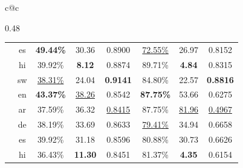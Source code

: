 \begin{table}[t!]
\begin{tabular}{c@{\hspace{1em}}c}
\begin{subtable}[c]{0.48\textwidth}
{\begin{tabular}{ccccc|ccc}
          & \cellcolor[HTML]{FFF1D5}\textsf{es} & \cellcolor[HTML]{FFF1D5}\textbf{49.44\%} & \cellcolor[HTML]{FFF1D5}30.36 & \cellcolor[HTML]{FFF1D5}0.8900 & \cellcolor[HTML]{FFF1D5}\underline{72.55\%} & \cellcolor[HTML]{FFF1D5}26.97 & \cellcolor[HTML]{FFF1D5}0.8152\\


          & \cellcolor[HTML]{F2CFC2}\textsf{hi} & \cellcolor[HTML]{F2CFC2}39.92\% & \cellcolor[HTML]{F2CFC2}\textbf{8.12} & \cellcolor[HTML]{F2CFC2}0.8874 & \cellcolor[HTML]{F2CFC2}89.71\% & \cellcolor[HTML]{F2CFC2}\textbf{4.84} & \cellcolor[HTML]{F2CFC2}0.8315\\


          & \cellcolor[HTML]{DDF6D2}\textsf{sw} & \cellcolor[HTML]{DDF6D2}\underline{38.31\%} & \cellcolor[HTML]{DDF6D2}24.04 & \cellcolor[HTML]{DDF6D2}\textbf{0.9141} & \cellcolor[HTML]{DDF6D2}84.80\% & \cellcolor[HTML]{DDF6D2}22.57 & \cellcolor[HTML]{DDF6D2}\textbf{0.8816}\\

            \midrule

          \multirow{6}{*}{\rotatebox[origin=c]{90}{\scriptsize{\lm{Gemma3-27B}}}}
          & \cellcolor[HTML]{d8d8d8}\textsf{en} & \cellcolor[HTML]{d8d8d8}\textbf{43.37\%} & \cellcolor[HTML]{d8d8d8}\underline{38.26} & \cellcolor[HTML]{d8d8d8}0.8542 & \cellcolor[HTML]{d8d8d8}\textbf{87.75\%} & \cellcolor[HTML]{d8d8d8}53.66 & \cellcolor[HTML]{d8d8d8}0.6275\\

          & \cellcolor[HTML]{E5CCFF}\textsf{ar} & \cellcolor[HTML]{E5CCFF}37.59\% & \cellcolor[HTML]{E5CCFF}36.32 & \cellcolor[HTML]{E5CCFF}\underline{0.8415}& \cellcolor[HTML]{E5CCFF}87.75\% & \cellcolor[HTML]{E5CCFF}\underline{81.96} & \cellcolor[HTML]{E5CCFF}\underline{0.4967} \\

          & \cellcolor[HTML]{E0E6FF}\textsf{de} & \cellcolor[HTML]{E0E6FF}38.19\% & \cellcolor[HTML]{E0E6FF}33.69 & \cellcolor[HTML]{E0E6FF}0.8633 & \cellcolor[HTML]{E0E6FF}\underline{79.41\%} & \cellcolor[HTML]{E0E6FF}34.94 & \cellcolor[HTML]{E0E6FF}0.6658\\


          & \cellcolor[HTML]{FFF1D5}\textsf{es} & \cellcolor[HTML]{FFF1D5}39.92\% & \cellcolor[HTML]{FFF1D5}31.18 & \cellcolor[HTML]{FFF1D5}0.8596 & \cellcolor[HTML]{FFF1D5}80.88\% & \cellcolor[HTML]{FFF1D5}30.73 & \cellcolor[HTML]{FFF1D5}0.6626\\


          & \cellcolor[HTML]{F2CFC2}\textsf{hi} & \cellcolor[HTML]{F2CFC2}36.43\% & \cellcolor[HTML]{F2CFC2}\textbf{11.30} & \cellcolor[HTML]{F2CFC2}0.8451& \cellcolor[HTML]{F2CFC2}81.37\% & \cellcolor[HTML]{F2CFC2}\textbf{4.35} & \cellcolor[HTML]{F2CFC2}0.6154\\


\end{tabular}}
\end{subtable}
\end{tabular}
\end{table}
